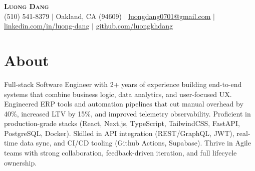 \documentclass[letterpaper,10pt]{article}
\begin{document}
\begin{center}
    \textbf{\huge \scshape Luong Dang} \\ \vspace{1pt} %
    \small %
    (510) 541-8379 $|$
    \small %
    Oakland, CA (94609) $|$
    \href{mailto:luongdang0701@gmail.com}{\underline{luongdang0701@gmail.com}} $|$
    \href{https://linkedin.com/in/luong-dang}{\underline{linkedin.com/in/luong-dang}} $|$
    \href{https://github.com/luongkhdang}{\underline{github.com/luongkhdang}}
\end{center}
\vspace{-16pt}
\section{About} 
\small{\justifying %
Full-stack Software Engineer with 2+ years of experience building end-to-end systems that combine business logic, data analytics, and user-focused UX. Engineered ERP tools and automation pipelines that cut manual overhead by 40\%, increased LTV by 15\%, and improved telemetry observability. Proficient in production-grade stacks (React, Next.js, TypeScript, TailwindCSS, FastAPI, PostgreSQL, Docker). Skilled in API integration (REST/GraphQL, JWT), real-time data sync, and CI/CD tooling (Github Actions, Supabase). Thrive in Agile teams with strong collaboration, feedback-driven iteration, and full lifecycle ownership.
} %

\end{document}
